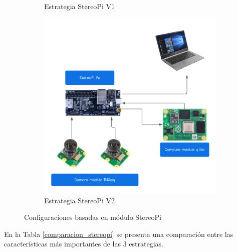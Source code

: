 \begin{figure}[H]
\begin{subfigure}[b]{0.4\textwidth}
        \caption{Estrategia StereoPi V1}
        \label{estrategia_v1}
     \end{subfigure}
     \hfill
     \begin{subfigure}[b]{0.4\textwidth}
         \centering
        \includegraphics[scale=0.4]{Recursos/estrategia_stereopi_v2.png}
        \caption{Estrategia StereoPi V2}
        \label{estrategia_v2}
     \end{subfigure}
     \hfill
\caption{Configuraciones basadas en módulo StereoPi}
\label{estrategias_stereopi}
\end{figure}
En la Tabla \ref{comparacion_stereopi} se presenta una comparación entre las características más importantes de las 3 estrategias.
